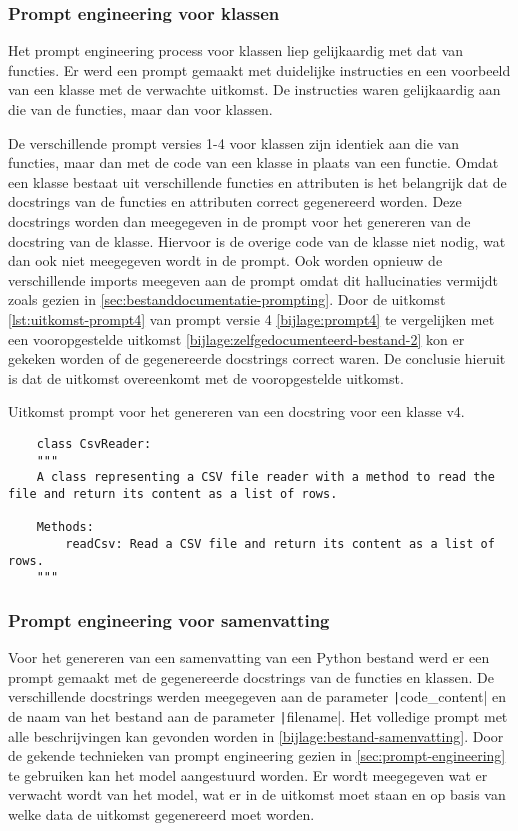 \subsubsection{Prompt engineering voor klassen}
Het prompt engineering process voor klassen liep gelijkaardig met dat van functies.
Er werd een prompt gemaakt met duidelijke instructies en een voorbeeld van een klasse met de verwachte uitkomst.
De instructies waren gelijkaardig aan die van de functies, maar dan voor klassen.

De verschillende prompt versies 1-4 voor klassen zijn identiek aan die van functies, maar dan met de code van een klasse in plaats van een functie.
Omdat een klasse bestaat uit verschillende functies en attributen is het belangrijk dat de docstrings van de functies en attributen correct gegenereerd worden.
Deze docstrings worden dan meegegeven in de prompt voor het genereren van de docstring van de klasse.
Hiervoor is de overige code van de klasse niet nodig, wat dan ook niet meegegeven wordt in de prompt.
Ook worden opnieuw de verschillende imports meegeven aan de prompt omdat dit hallucinaties vermijdt zoals gezien in \ref{sec:bestanddocumentatie-prompting}.
Door de uitkomst \ref{lst:uitkomst-prompt4} van prompt versie 4 \ref{bijlage:prompt4} te vergelijken met een vooropgestelde uitkomst \ref{bijlage:zelfgedocumenteerd-bestand-2} kon er gekeken worden of de gegenereerde docstrings correct waren.
De conclusie hieruit is dat de uitkomst overeenkomt met de vooropgestelde uitkomst. 

\begin{listing}
    \caption{Uitkomst prompt voor het genereren van een docstring voor een klasse v4.}
    \label{lst:uitkomst-prompt4}
    \begin{verbatim}
    class CsvReader:
    """
    A class representing a CSV file reader with a method to read the file and return its content as a list of rows.

    Methods:
        readCsv: Read a CSV file and return its content as a list of rows.
    """
    \end{verbatim}
\end{listing}

\subsubsection{Prompt engineering voor samenvatting}
Voor het genereren van een samenvatting van een Python bestand werd er een prompt gemaakt met de gegenereerde docstrings van de functies en klassen.
De verschillende docstrings werden meegegeven aan de parameter \texttt|code_content| en de naam van het bestand aan de parameter 
\texttt|filename|.
Het volledige prompt met alle beschrijvingen kan gevonden worden in \ref{bijlage:bestand-samenvatting}.
Door de gekende technieken van prompt engineering gezien in \ref{sec:prompt-engineering} te gebruiken kan het model aangestuurd worden.
Er wordt meegegeven wat er verwacht wordt van het model, wat er in de uitkomst moet staan en op basis van welke data de uitkomst gegenereerd moet worden.

